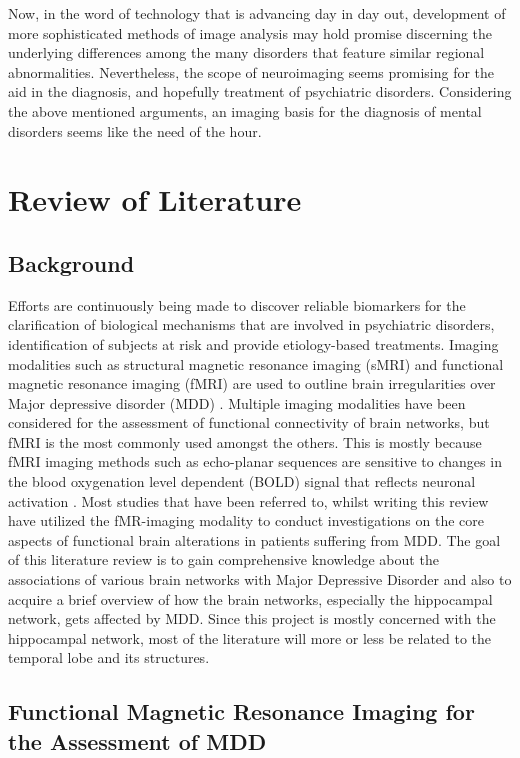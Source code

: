 ﻿\documentclass[12pt]{article}
\begin{document}
Now, in the word of technology that is advancing day in day out,
development of more sophisticated methods of image analysis may hold
promise discerning the underlying differences among the many disorders
that feature similar regional abnormalities. Nevertheless, the scope
of neuroimaging seems promising for the aid in the diagnosis, and
hopefully treatment of psychiatric disorders. Considering the above
mentioned arguments, an imaging basis for the diagnosis of mental
disorders seems like the need of the hour.

\newpage
\section{Review of Literature}

\subsection{Background}

Efforts are continuously being made to discover reliable biomarkers
for the clarification of biological mechanisms that are involved in
psychiatric disorders, identification of subjects at risk and provide
etiology-based treatments. Imaging modalities such as structural
magnetic resonance imaging (sMRI) and functional magnetic resonance
imaging (fMRI) are used to outline brain irregularities over Major
depressive disorder (MDD)\cite{structuralbrainimaging}
\cite{fMRIFuture}. Multiple imaging modalities have been considered
for the assessment of functional connectivity of brain networks, but
fMRI is the most commonly used amongst the others. This is mostly
because fMRI imaging methods such as echo-planar sequences are
sensitive to changes in the blood oxygenation level dependent (BOLD)
signal that reflects neuronal activation \cite{rogersassessing}. Most
studies that have been referred to, whilst writing this review have
utilized the fMR-imaging modality to conduct investigations on the
core aspects of functional brain alterations in patients suffering
from MDD. The goal of this literature review is to gain comprehensive
knowledge about the associations of various brain networks with Major
Depressive Disorder and also to acquire a brief overview of how the
brain networks, especially the hippocampal network, gets affected by
MDD. Since this project is mostly concerned with the hippocampal
network, most of the literature will more or less be related to the
temporal lobe and its structures.

\subsection{Functional Magnetic Resonance Imaging for the Assessment
of MDD}
\end{document}
